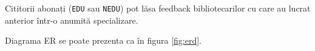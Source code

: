 Cititorii abonați (\texttt{EDU} sau \texttt{NEDU}) pot lăsa feedback
bibliotecarilor cu care au lucrat anterior într-o anumită specializare.

Diagrama ER se poate prezenta ca în figura \ref{fig:erd}.



\newpage

